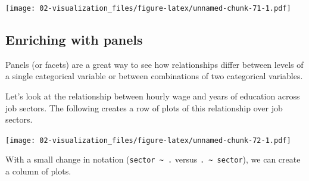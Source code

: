 \documentclass[
]{book}
\newenvironment{Shaded}{\begin{snugshade}}{\end{snugshade}}
\newcommand{\DataTypeTok}[1]{\textcolor[rgb]{0.13,0.29,0.53}{#1}}
\newcommand{\KeywordTok}[1]{\textcolor[rgb]{0.13,0.29,0.53}{\textbf{#1}}}
\newcommand{\NormalTok}[1]{#1}
\newcommand{\OperatorTok}[1]{\textcolor[rgb]{0.81,0.36,0.00}{\textbf{#1}}}
\newcommand{\StringTok}[1]{\textcolor[rgb]{0.31,0.60,0.02}{#1}}
\begin{document}
\texttt{[image: 02-visualization\_files/figure-latex/unnamed-chunk-71-1.pdf]}

\hypertarget{enriching-with-panels}{%
\subsection{Enriching with panels}\label{enriching-with-panels}}

Panels (or facets) are a great way to see how relationships differ between levels of a single categorical variable or between combinations of two categorical variables.

Let's look at the relationship between hourly wage and years of education across job sectors. The following creates a row of plots of this relationship over job sectors.

\begin{Shaded}
\end{Shaded}

\texttt{[image: 02-visualization\_files/figure-latex/unnamed-chunk-72-1.pdf]}

With a small change in notation (\texttt{sector\ \textasciitilde{}\ .} versus \texttt{.\ \textasciitilde{}\ sector}), we can create a column of plots.

\begin{Shaded}
\end{Shaded}
\end{document}
